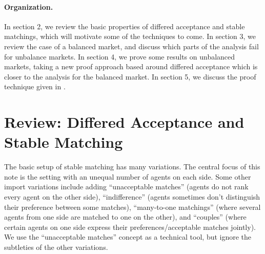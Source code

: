 \documentclass[12pt]{article}
\begin{document}
  \paragraph{Organization.}
  In section 2, we review the basic properties of differed acceptance and stable
  matchings, which will motivate some of the techniques to come.
  In section 3, we review the case of a balanced market, and discuss which parts
  of the analysis fail for unbalance markets.
  In section 4, we prove some results on unbalanced markets, taking a new proof
  approach based around differed acceptance which is closer to the analysis for
  the balanced market.
  In section 5, we discuss the proof technique given in
  \cite{AshlagiUnbalancedCompetition17}.

\section{Review: Differed Acceptance and Stable Matching}

  The basic setup of stable matching has many variations.
  The central focus of this note is the setting with an unequal number of agents
  on each side.
  Some other import variations include adding ``unacceptable matches'' (agents do not
  rank every agent on the other side), ``indifference'' (agents sometimes don't
  distinguish their preference between some matches), ``many-to-one matchings''
  (where several agents from one side are matched to one on the other),
  and ``couples'' (where certain agents on one side express their 
  preferences/acceptable matches jointly).
  We use the ``unacceptable matches'' concept as a technical tool,
  but ignore the subtleties of the other variations.
\end{document}
